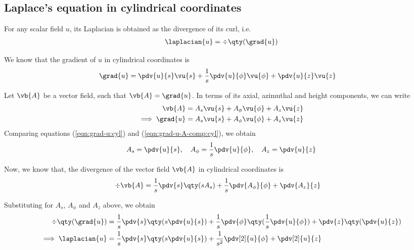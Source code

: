     \setcounter{equation}{0}
    \subsection{Laplace's equation in cylindrical coordinates}
        For any scalar field $u$, its Laplacian is obtained as the divergence of its curl, i.e.
        \begin{align}
            \laplacian{u}=\div{\qty(\grad{u})} \label{eqn:laplacian-div-grad}
        \end{align}

        We know that the gradient of $u$ in cylindrical coordinates is
        \begin{align}
            \grad{u}&=\pdv{u}{s}\vu{s}+\dfrac{1}{s}\pdv{u}{\phi}\vu{\phi}+\pdv{u}{z}\vu{z} \label{eqn:grad-u:cyl}
        \end{align}

        Let $\vb{A}$ be a vector field, such that $\vb{A}=\grad{u}$. In terms of its axial, azimuthal and height components, we can write
        \begin{align}
            \vb{A}&=A_s\vu{s}+A_\phi\vu{\phi}+A_z\vu{z} \nonumber\\
            \implies\grad{u}&=A_s\vu{s}+A_\phi\vu{\phi}+A_z\vu{z} \label{eqn:grad-u-A-comp:cyl}
        \end{align}
        Comparing equations (\ref{eqn:grad-u:cyl}) and (\ref{eqn:grad-u-A-comp:cyl}), we obtain
        \begin{align*}
            A_s=\pdv{u}{s},\quad A_\phi=\dfrac{1}{s}\pdv{u}{\phi},\quad A_z=\pdv{u}{z}
        \end{align*}

        Now, we know that, the divergence of the vector field $\vb{A}$ in cylindrical coordinates is
        \begin{align*}
            \div{\vb{A}}&=\dfrac{1}{s}\pdv{s}\qty(sA_s)+\dfrac{1}{s}\pdv{A_\phi}{\phi}+\pdv{A_z}{z}
        \end{align*}
        
        Substituting for $A_s$, $A_\phi$ and $A_z$ above, we obtain
        \begin{align}
            \div{\qty(\grad{u})}&=\dfrac{1}{s}\pdv{s}\qty(s\pdv{u}{s})+\dfrac{1}{s}\pdv{\phi}\qty(\dfrac{1}{s}\pdv{u}{\phi})+\pdv{z}\qty(\pdv{u}{z}) \nonumber\\
            \implies\laplacian{u}&=\dfrac{1}{s}\pdv{s}\qty(s\pdv{u}{s})+\dfrac{1}{s^2}\pdv[2]{u}{\phi}+\pdv[2]{u}{z} \label{eqn:laplacian-cyl}
        \end{align}


